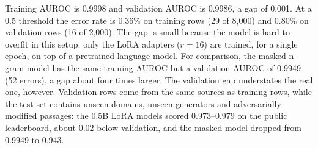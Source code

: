 

Training AUROC is 0.9998 and validation AUROC is 0.9986, a gap of 0.001. At a 0.5 threshold the error rate is 0.36\% on training rows (29 of 8{,}000) and 0.80\% on validation rows (16 of 2{,}000). The gap is small because the model is hard to overfit in this setup: only the LoRA adapters ($r=16$) are trained, for a single epoch, on top of a pretrained language model. For comparison, the masked n-gram model has the same training AUROC but a validation AUROC of 0.9949 (52 errors), a gap about four times larger. The validation gap understates the real one, however. Validation rows come from the same sources as training rows, while the test set contains unseen domains, unseen generators and adversarially modified passages: the 0.5B LoRA models scored 0.973--0.979 on the public leaderboard, about 0.02 below validation, and the masked model dropped from 0.9949 to 0.943.

